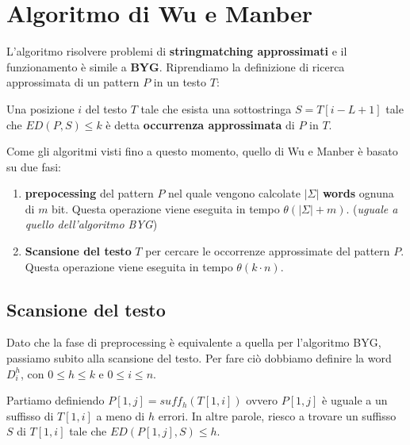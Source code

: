 \section{Algoritmo di Wu e Manber}
L'algoritmo risolvere problemi di \textbf{stringmatching approssimati} e il funzionamento
è simile a \textbf{BYG}.
Riprendiamo la definizione di ricerca approssimata di un pattern $P$ in un testo $T$:
\begin{definizione}
    Una posizione $i$ del testo $T$ tale che esista una sottostringa $S =T[i - L + 1]$
    tale che $ED(P, S) \leq k$ è detta \textbf{occurrenza approssimata} di $P$ in $T$.
\end{definizione}

Come gli algoritmi visti fino a questo momento, quello di Wu e Manber è basato su due fasi:
\begin{enumerate}
    \item \textbf{prepocessing} del pattern $P$ nel quale vengono calcolate $|\Sigma|$
          \textbf{words} ognuna di $m$ bit. Questa operazione viene eseguita in tempo
          $\theta(|\Sigma| + m)$. (\textit{uguale a quello dell'algoritmo BYG})
    \item \textbf{Scansione del testo} $T$ per cercare le occorrenze approssimate del pattern $P$.
          Questa operazione viene eseguita in tempo $\theta(k \cdot n)$.
\end{enumerate}
\subsection{Scansione del testo}
Dato che la fase di preprocessing è equivalente a quella per l'algoritmo BYG,
passiamo subito alla scansione del testo. Per fare ciò dobbiamo definire la word
$D_i^h$, con $0 \leq h \leq k$ e $0 \leq i \leq n$.

Partiamo definiendo $P[1, j] = suff_h(T[1, i])$ ovvero $P[1, j]$ è uguale a un
suffisso di $T[1, i]$ a meno di $h$ errori. In altre parole, riesco a trovare un
suffisso $S$ di $T[1, i]$ tale che $ED(P[1, j], S) \leq h$.

